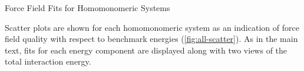 \begin{section}{Force Field Fits for Homomonomeric Systems}

Scatter plots are shown for each homomonomeric system as
an indication of force field quality with respect to \saptpbeo benchmark energies
(\cref{fig:all-scatter}). 
As in the main text, fits for each energy component are displayed along with
two views of the total interaction energy.  


\end{section}
